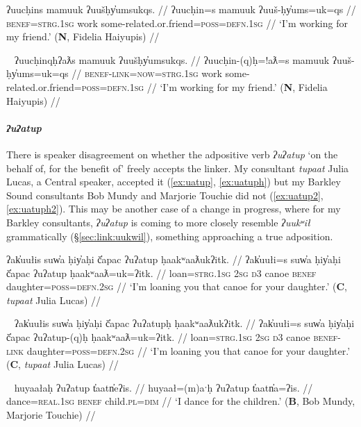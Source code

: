 \ex \label{ex:uuchin}
\begingl
\glpreamble ʔuucḥins mamuuk ʔuušḥy̓umsukqs. //
\gla ʔuucḥin=s mamuuk ʔuuš-ḥy̓ums=uk=qs //
\glb \textsc{benef}=\textsc{strg.1sg} work some-related.or.friend=\textsc{poss}=\textsc{defn.1sg} //
\glft `I'm working for my friend.' (\textbf{N}, Fidelia Haiyupis) //
\endgl
\xe

\ex~ \label{ex:uuchinqh}
\begingl
\glpreamble ʔuucḥinqḥʔaƛs mamuuk ʔuušḥy̓umsukqs. //
\gla ʔuucḥin-(q)ḥ=!aƛ=s mamuuk ʔuuš-ḥy̓ums=uk=qs //
\glb \textsc{benef}-\textsc{link}=\textsc{now}=\textsc{strg.1sg} work some-related.or.friend=\textsc{poss}=\textsc{defn.1sg} //
\glft `I'm working for my friend.' (\textbf{N}, Fidelia Haiyupis) //
\endgl
\xe

\paragraph{\textit{ʔuʔatup}} \label{sec:link:uatup} There is speaker disagreement on whether the adpositive verb \textit{ʔuʔatup} `on the behalf of, for the benefit of' freely accepts the linker. My consultant \textit{tupaat} Julia Lucas, a Central speaker, accepted it (\ref{ex:uatup}, \ref{ex:uatuph}) but my Barkley Sound consultants Bob Mundy and Marjorie Touchie did not (\ref{ex:uatup2}, \ref{ex:uatuph2}). This may be another case of a change in progress, where for my Barkley consultants, \textit{ʔuʔatup} is coming to more closely resemble \textit{ʔuukʷił} grammatically (\S\ref{sec:link:uukwil}), something approaching a true adposition.

\ex \label{ex:uatup}
\begingl
\glpreamble ʔak̓uułis suw̓a ḥiy̓aḥi č̓apac ʔuʔatup ḥaakʷaaƛukʔitk. //
\gla ʔak̓uułi=s suw̓a ḥiy̓aḥi č̓apac ʔuʔatup ḥaakʷaaƛ=uk=ʔitk. //
\glb loan=\textsc{strg.1sg} \textsc{2sg} \textsc{d3} canoe \textsc{benef} daughter=\textsc{poss}=\textsc{defn.2sg} //
\glft `I’m loaning you that canoe for your daughter.' (\textbf{C}, \textit{tupaat} Julia Lucas) //
\endgl
\xe

\ex~ \label{ex:uatuph}
\begingl
\glpreamble ʔak̓uułis suw̓a ḥiy̓aḥi č̓apac ʔuʔatupḥ ḥaakʷaaƛukʔitk. //
\gla ʔak̓uułi=s suw̓a ḥiy̓aḥi č̓apac ʔuʔatup-(q)ḥ ḥaakʷaaƛ=uk=ʔitk. //
\glb loan=\textsc{strg.1sg} \textsc{2sg} \textsc{d3} canoe \textsc{benef}-\textsc{link} daughter=\textsc{poss}=\textsc{defn.2sg} //
\glft `I’m loaning you that canoe for your daughter.' (\textbf{C}, \textit{tupaat} Julia Lucas) //
\endgl
\xe

\ex~ \label{ex:uatup2}
\begingl
\glpreamble huyaałaḥ ʔuʔatup t̓aatn̓eʔis. //
\gla huyaał=(m)aˑḥ ʔuʔatup t̓aatn̓a=ʔis. //
\glb dance=\textsc{real.1sg} \textsc{benef} child.\textsc{pl}=\textsc{dim} //
\glft `I dance for the children.' (\textbf{B}, Bob Mundy, Marjorie Touchie) //
\endgl
\xe


